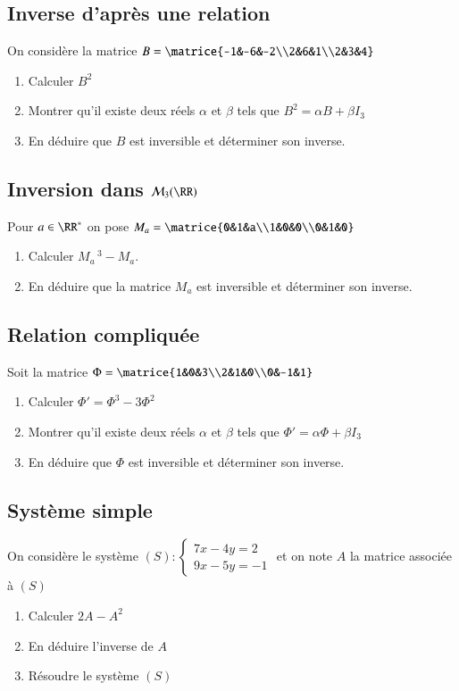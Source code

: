 \documentclass[oneside,12pt]{article}          %
\begin{document}
\subsection{Inverse d'après une relation}
On considère la matrice $B=\matrice{-1&-6&-2\\2&6&1\\2&3&4} $
    \begin{enumerate}
        \item Calculer $B^2$
        \item Montrer qu'il existe deux réels $\alpha$ et $\beta$ tels que $B^2=\alpha B+\beta I_3$
        \item En déduire que $B$ est inversible et déterminer son inverse.
    \end{enumerate}



\subsection{Inversion dans $\mathcal{M}_3(\RR)$}
Pour $a\in\RR^*$ on pose $M_a=\matrice{0&1&a\\1&0&0\\0&1&0}$
\begin{enumerate}
	\item Calculer $M_a\,^3-M_a$. 
	\item En déduire que la matrice $M_a$ est inversible et déterminer son inverse.
\end{enumerate}



\subsection{Relation compliquée}
Soit la matrice $\Phi=\matrice{1&0&3\\2&1&0\\0&-1&1} $
    \begin{enumerate}
        \item Calculer $\Phi'=\Phi^3-3\Phi^2$
        \item Montrer qu'il existe deux réels $\alpha$ et $\beta$ tels que $\Phi'=\alpha\Phi+\beta I_3$
        \item En déduire que $\Phi$ est inversible et déterminer son inverse.
    \end{enumerate}



\subsection{Système simple}
On considère le système $(S):\begin{cases}7x-4y=2\\9x-5y=-1\end{cases} $ et on note $A$ la matrice associée à $(S)$
    \begin{enumerate}
        \item Calculer $2A-A^2$
        \item En déduire l'inverse de $A$
        \item Résoudre le système $(S)$
    \end{enumerate}
    
\end{document}
